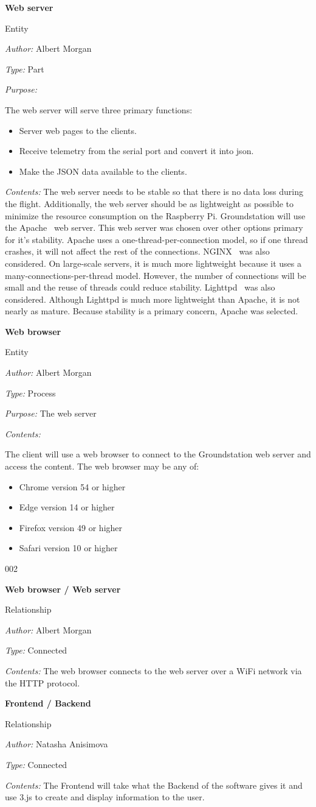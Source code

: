 \documentclass[10pt,draftclsnofoot,onecolumn]{IEEEtran}
\newcommand{\newentity}[5]{
	\begin{minipage}{\linewidth}
	\noindent\textbf{#2}
	
	\noindent Entity
	
	\noindent\textit{Author:} {#1}
		
	\noindent\textit{Type:} {#3}
	
	\noindent\textit{Purpose:} {#4}
	
	\noindent\textit{Contents:} {#5}
	\vspace{.5cm}
	\end{minipage}
}
\newcommand{\newrelationship}[4]{
	\begin{minipage}{\linewidth}
	\noindent\textbf{#2}
	
	\noindent Relationship
	
	\noindent\textit{Author:} #1

	\noindent\textit{Type:} #3

	\noindent\textit{Contents:} #4
	\vspace{.5cm}
	\end{minipage}
}
\begin{document}
	\newentity
	{Albert Morgan}
	{Web server}
	{Part}
	{	The web server will serve three primary functions:
		\begin{itemize}
		\item Server web pages to the clients.
		\item Receive telemetry from the serial port and convert it into json.
		\item Make the JSON data available to the clients.
		\end{itemize}
	}
	{
		The web server needs to be stable so that there is no data loss during the flight.
		Additionally, the web server should be as lightweight as possible to minimize the resource consumption on the Raspberry Pi.
		Groundstation will use the Apache~\cite{apache} web server.
		This web server was chosen over other options primary for it's stability.
		Apache uses a one-thread-per-connection model, so if one thread crashes, it will not affect the rest of the connections.
		NGINX~\cite{nginx} was also considered. On large-scale servers, it is much more lightweight because it uses a many-connections-per-thread
		model. However, the number of connections will be small and the reuse of threads could reduce stability.
		Lighttpd~\cite{lighttpd} was also considered. Although Lighttpd is much more lightweight than Apache,
		it is not nearly as mature.
		Because stability is a primary concern, Apache was selected.
	}

	\newentity
	{Albert Morgan}
	{Web browser}
	{Process}
	{The web server}
	{	The client will use a web browser to connect to the Groundstation web server and access the content.
		The web browser may be any of:
		\begin{itemize}
			\item Chrome version 54 or higher
			\item Edge version 14 or higher
			\item Firefox version 49 or higher
			\item Safari version 10 or higher
		\end{itemize}002
	}

	\newrelationship
	{Albert Morgan}
	{Web browser / Web server}
	{Connected}
	{The web browser connects to the web server over a WiFi network via the HTTP protocol.}
	
	\newrelationship
	{Natasha Anisimova}
	{Frontend / Backend}
	{Connected}
	{The Frontend will take what the Backend of the software gives it and use 3.js to create and display information to the user.}
	
\end{document}
